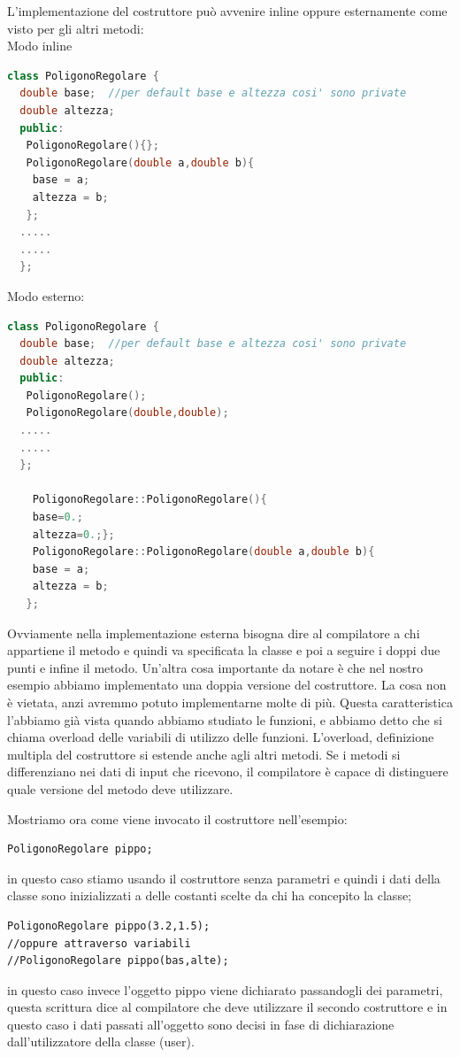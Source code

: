 \documentclass[11pt,fleqn]{book} %
\begin{document}
  L'implementazione del costruttore può avvenire inline oppure esternamente come visto per gli altri metodi:\\
  Modo inline
  \begin{lstlisting}[language=c++]
class PoligonoRegolare {
  double base;  //per default base e altezza cosi' sono private
  double altezza;
  public:
   PoligonoRegolare(){};
   PoligonoRegolare(double a,double b){
    base = a;
    altezza = b;   
   };
  .....
  .....
  }; 
  \end{lstlisting}
Modo esterno:

   \begin{lstlisting}[language=c++]
class PoligonoRegolare {
  double base;  //per default base e altezza cosi' sono private
  double altezza;
  public:
   PoligonoRegolare();
   PoligonoRegolare(double,double);
  .....
  .....
  }; 
  
    PoligonoRegolare::PoligonoRegolare(){
    base=0.;
    altezza=0.;};
    PoligonoRegolare::PoligonoRegolare(double a,double b){
    base = a;
    altezza = b;   
   };
  \end{lstlisting}

Ovviamente nella implementazione esterna bisogna dire al compilatore a chi appartiene il metodo e quindi va specificata la classe e poi a seguire i doppi due punti e infine il metodo.
Un'altra cosa importante da notare è che nel nostro esempio abbiamo implementato una doppia versione del costruttore. La cosa non è vietata, anzi avremmo potuto implementarne molte di più. Questa caratteristica l'abbiamo già vista quando abbiamo studiato le funzioni, e abbiamo detto che si chiama overload delle variabili di utilizzo delle funzioni. L'overload, definizione multipla del costruttore si estende anche agli altri metodi. Se i metodi si differenziano nei dati di input che ricevono, il compilatore è capace di distinguere quale versione del metodo deve utilizzare.

Mostriamo ora come viene invocato il costruttore nell'esempio:
\begin{verbatim}
PoligonoRegolare pippo;
\end{verbatim}
in questo caso stiamo usando il costruttore senza parametri e quindi i dati della classe sono inizializzati a delle costanti scelte da chi ha concepito la classe;
\begin{verbatim}
PoligonoRegolare pippo(3.2,1.5);
//oppure attraverso variabili
//PoligonoRegolare pippo(bas,alte);
\end{verbatim}
in questo caso invece l'oggetto pippo viene dichiarato passandogli dei parametri, questa scrittura dice al compilatore che deve utilizzare il secondo costruttore e in questo caso i dati passati all'oggetto sono decisi in fase di dichiarazione dall'utilizzatore della classe (user).
\end{document}
